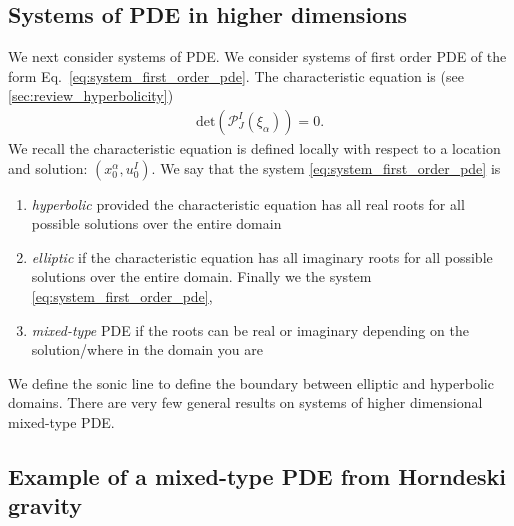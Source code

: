 \documentclass{ws-ijmpd}
\begin{document}
\subsection{Systems of PDE in higher dimensions
   \label{sec:systems_higher_dimensions_mixed}
}
We next consider systems of PDE. 
We consider systems of first order PDE of the form 
Eq.~\eqref{eq:system_first_order_pde}.
The characteristic equation is (see \ref{sec:review_hyperbolicity}) 
\begin{align}
   \mathrm{det}\left(\mathcal{P}^I_J\left(\xi_{\alpha}\right)\right)
   =
   0
   .
\end{align}
We recall the characteristic equation is defined locally with respect
to a location and solution: 
$\left(x^{\alpha}_0,u^I_0\right)$.
We say that 
the system \eqref{eq:system_first_order_pde} is 
\begin{enumerate}
   \item \emph{hyperbolic} provided the characteristic equation has
all real roots for all possible solutions over the entire domain
   \item \emph{elliptic} if the characteristic equation
has all imaginary roots for all possible solutions over the entire domain.
Finally we the system \eqref{eq:system_first_order_pde},
   \item \emph{mixed-type} PDE if the roots can be real or
imaginary depending on the solution/where in the domain you are
\end{enumerate}
We define the sonic line to define the boundary between elliptic
and hyperbolic domains. There are very few general
results on systems of higher dimensional mixed-type PDE.

\subsection{Example of a mixed-type PDE from Horndeski gravity}
\end{document}
